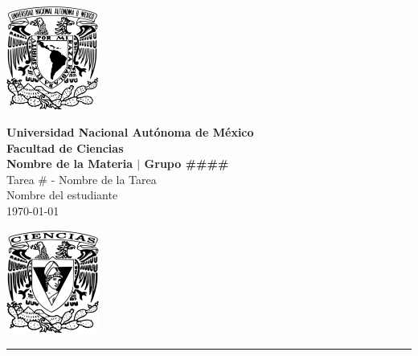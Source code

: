 \documentclass[11pt,letterpaper]{article}
\begin{document}
\begin{center}
    \begin{minipage}{3cm}
    	\begin{center}
    		\includegraphics[height=3.4cm]{Logo_UNAM.png}
    	\end{center}
    \end{minipage}\hfill
    \begin{minipage}{10cm}
    	\begin{center}
    	\textbf{\large Universidad Nacional Autónoma de México}\\[0.1cm]
        \textbf{Facultad de Ciencias}\\[0.1cm]
        \textbf{Nombre de la Materia $|$ Grupo \#\#\#\#}\\[0.1cm]
        Tarea \# - Nombre de la Tarea\\[0.1cm]
        Nombre del estudiante\\[0.1cm]
        \today
    	\end{center}
    \end{minipage}\hfill
    \begin{minipage}{3cm}
    	\begin{center}
    		\includegraphics[height=3.4cm]{Logo_FC.png}
    	\end{center}
    \end{minipage}
\end{center}

\rule{17cm}{0.1mm}

\end{document}
